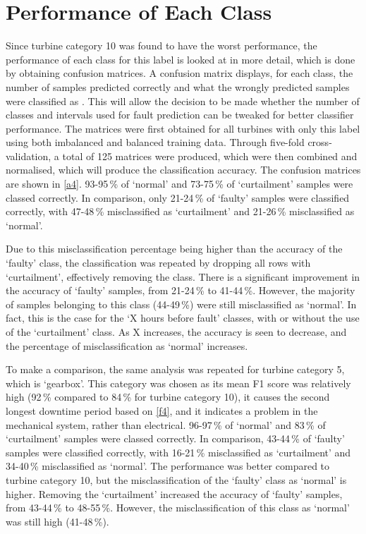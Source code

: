 \section{Performance of Each Class}

Since turbine category 10 was found to have the worst performance, the
performance of each class for this label is looked at in more detail, which is
done by obtaining confusion matrices. A confusion matrix displays, for each
class, the number of samples predicted correctly and what the wrongly
predicted samples were classified as \cite{33M}. This will allow the decision
to be made whether the number of classes and intervals used for fault
prediction can be tweaked for better classifier performance. The matrices were
first obtained for all turbines with only this label using both imbalanced and
balanced training data. Through five-fold cross-validation, a total of 125
matrices were produced, which were then combined and normalised, which will
produce the classification accuracy. The confusion matrices are shown in
\autoref{a4}. 93-95\,\% of `normal' and 73-75\,\% of `curtailment' samples
were classed correctly. In comparison, only 21-24\,\% of `faulty' samples were
classified correctly, with 47-48\,\% misclassified as `curtailment' and
21-26\,\% misclassified as `normal'.

Due to this misclassification percentage being higher than the accuracy of the
`faulty' class, the classification was repeated by dropping all rows with
`curtailment', effectively removing the class. There is a significant
improvement in the accuracy of `faulty' samples, from 21-24\,\% to 41-44\,\%.
However, the majority of samples belonging to this class (44-49\,\%) were
still misclassified as `normal'. In fact, this is the case for the `X hours
before fault' classes, with or without the use of the `curtailment' class. As
X increases, the accuracy is seen to decrease, and the percentage of
misclassification as `normal' increases.

To make a comparison, the same analysis was repeated for turbine category 5,
which is `gearbox'. This category was chosen as its mean F1 score was
relatively high (92\,\% compared to 84\,\% for turbine category 10), it causes
the second longest downtime period based on \autoref{f4}, and it indicates a
problem in the mechanical system, rather than electrical. 96-97\,\% of
`normal' and 83\,\% of `curtailment' samples were classed correctly. In
comparison, 43-44\,\% of `faulty' samples were classified correctly, with
16-21\,\% misclassified as `curtailment' and 34-40\,\% misclassified as
`normal'. The performance was better compared to turbine category 10, but the
misclassification of the `faulty' class as `normal' is higher. Removing the
`curtailment' increased the accuracy of `faulty' samples, from 43-44\,\% to
48-55\,\%. However, the misclassification of this class as `normal' was still
high (41-48\,\%).

